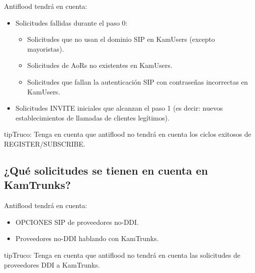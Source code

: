 \documentclass[letterpaper,10pt,spanish]{sphinxmanual}
\begin{document}
Antiflood tendrá en cuenta:
\begin{itemize}
\item {} 
Solicitudes fallidas durante el paso 0:
\begin{itemize}
\item {} 
Solicitudes que no usan el dominio SIP en KamUsers (excepto mayoristas).

\item {} 
Solicitudes de AoRs no existentes en KamUsers.

\item {} 
Solicitudes que fallan la autenticación SIP con contraseñas incorrectas en KamUsers.

\end{itemize}

\item {} 
Solicitudes INVITE iniciales que alcanzan el paso 1 (es decir: nuevos establecimientos de llamadas de clientes legítimos).

\end{itemize}

\begin{notice}{tip}{Truco:}
Tenga en cuenta que antiflood no tendrá en cuenta los ciclos exitosos de REGISTER/SUBSCRIBE.
\end{notice}


\subsection{¿Qué solicitudes se tienen en cuenta en KamTrunks?}
\label{security_and_maintenance/security/antiflooding:which-requests-are-taken-into-account-in-kamtrunks}
Antiflood tendrá en cuenta:
\begin{itemize}
\item {} 
OPCIONES SIP de proveedores no-DDI.

\item {} 
Proveedores no-DDI hablando con KamTrunks.

\end{itemize}

\begin{notice}{tip}{Truco:}
Tenga en cuenta que antiflood no tendrá en cuenta las solicitudes de proveedores DDI a KamTrunks.
\end{notice}
\end{document}
